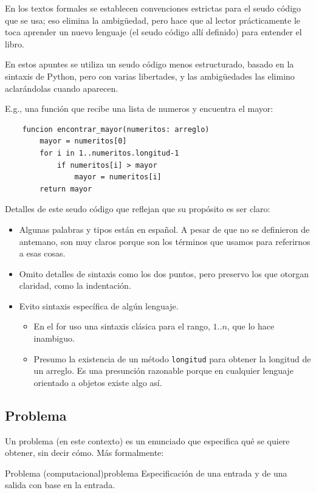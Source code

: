 En los textos formales se establecen convenciones estrictas para el seudo código que se usa; eso elimina la ambigüedad, pero hace que al lector prácticamente le toca aprender un nuevo lenguaje (el seudo código allí definido) para entender el libro. 

En estos apuntes se utiliza un seudo código menos estructurado, basado en la sintaxis de Python, pero con varias libertades, y las ambigüedades las elimino aclarándolas cuando aparecen.

E.g., una función que recibe una lista de numeros y encuentra el mayor:
\begin{verbatim}
    funcion encontrar_mayor(numeritos: arreglo)
        mayor = numeritos[0]
        for i in 1..numeritos.longitud-1
            if numeritos[i] > mayor
                mayor = numeritos[i]
        return mayor
\end{verbatim}
Detalles de este seudo código que reflejan que su propósito es ser claro:
\begin{itemize}
  \item Algunas palabras y tipos están en español. A pesar de que no se definieron de antemano, son muy claros porque son los términos que usamos para referirnos a esas cosas.
  \item Omito detalles de sintaxis como los dos puntos, pero preservo los que otorgan claridad, como la indentación.
  \item Evito sintaxis específica de algún lenguaje.
  \begin{itemize}
    \item En el for uso una sintaxis clásica para el rango, $1..n$, que lo hace inambiguo.
    \item Presumo la existencia de un método \texttt{longitud} para obtener la longitud de un arreglo. Es una presunción razonable porque en cualquier lenguaje orientado a objetos existe algo así.
  \end{itemize}
\end{itemize}

\subsection{Problema}

Un problema (en este contexto) es un enunciado que especifica qué se quiere obtener, sin decir cómo. Más formalmente:
\begin{definicion}{Problema (computacional)}{problema}
Especificación de una entrada y de una salida con base en la entrada.
\end{definicion}

